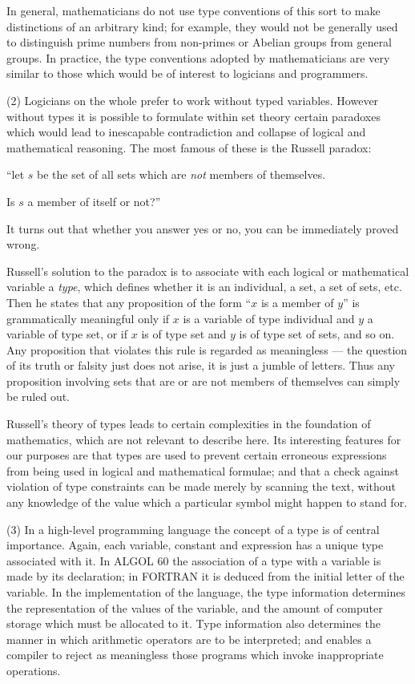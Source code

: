 In general, mathematicians do not use type conventions of this sort to make distinctions of an arbitrary kind; for example, they would not be generally used to distinguish prime numbers from non-primes or Abelian groups from general groups. In practice, the type conventions adopted by mathematicians are very similar to those which would be of interest to logicians and programmers.

(2) Logicians on the whole prefer to work without typed variables. However without types it is possible to formulate within set theory certain paradoxes which would lead to inescapable contradiction and collapse of logical and mathematical reasoning. The most famous of these is the Russell paradox:

\quad \hspace{-.4em}``let $s$ be the set of all sets which are \textit{not} members of themselves.

\quad Is $s$ a member of itself or not?''

\noindent
It turns out that whether you answer yes or no, you can be immediately proved wrong.

Russell's solution to the paradox is to associate with each logical or mathematical variable a \textit{type}, which defines whether it is an individual, a set, a set of sets, etc. Then he states that any proposition of the form ``$x$ is a member of $y$'' is grammatically meaningful only if $x$ is a variable of type individual and $y$ a variable of type set, or if $x$ is of type set and $y$ is of type set of sets, and so on. Any proposition that violates this rule is regarded as meaningless --- the question of its truth or falsity just does not arise, it is just a jumble of letters. Thus any proposition involving sets that are or are not members of themselves can simply be ruled out.

Russell's theory of types leads to certain complexities in the foundation of mathematics, which are not relevant to describe here. Its interesting features for our purposes are that types are used to prevent certain erroneous expressions from being used in logical and mathematical formulae; and that a check against violation of type constraints can be made merely by scanning the text, without any knowledge of the value which a particular symbol might happen to stand for.

(3) In a high-level programming language the concept of a type is of central importance. Again, each variable, constant and expression has a unique type associated with it. In ALGOL 60 the association of a type with a variable is made by its declaration; in FORTRAN it is deduced from the initial letter of the variable. In the implementation of the language, the type information determines the representation of the values of the variable, and the amount of computer storage which must be allocated to it. Type information also determines the manner in which arithmetic operators are to be interpreted; and enables a compiler to reject as meaningless those programs which invoke inappropriate operations.

